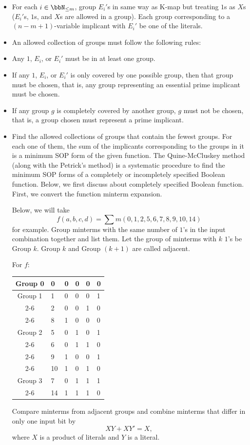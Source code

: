 \documentclass[a4paper,12pt]{article}
\begin{document}
\begin{itemize}
\begin{itemize}
\begin{itemize}
\begin{itemize}
\begin{itemize}
\begin{itemize}
\begin{itemize}
\begin{itemize}
\begin{itemize}
\item For each $i\in\bbN_{\leq m}$, group $E_i'$s in same way as K-map but treating $1$s as $X$s ($E_i'$s, $1$s, and $X$s are allowed in a group). Each group corresponding to a $(n-m+1)$-variable implicant with $E_i'$ be one of the literals.
\item An allowed collection of groups must follow the following rules:
\bit
\item Any $1$, $E_i$, or $E_i'$ must be in at least one group.
\item If any $1$, $E_i$, or $E_i'$ is only covered by one possible group, then that group must be chosen, that is, any group representing an essential prime implicant must be chosen.
\item If any group $g$ is completely covered by another group, $g$ must not be chosen, that is, a group chosen must represent a prime implicant.
\eit
\item Find the allowed collections of groups that contain the fewest groups. For each one of them, the sum of the implicants corresponding to the groups in it is a minimum SOP form of the given function.
\een
{}
The Quine-McCluskey method (along with the Petrick's method) is a systematic procedure to find the minimum SOP forms of a completely or incompletely specified Boolean function. Below, we first discuss about completely specified Boolean function.
First, we convert the function minterm expansion.

Below, we will take
\[f(a,b,c,d)=\sum m(0,1,2,5,6,7,8,9,10,14)\]
for example.
Group minterms with the same number of $1$'s in the input combination together and list them. Let the group of minterms with $k$ $1$'s be Group $k$. Group $k$ and Group $(k+1)$ are called adjacent.

For $f$:
\begin{longtable}[c]{|c|m|mmmm|}
\hline
Group 0 & 0 & 0 & 0 & 0 & 0 \\\hline
Group 1 & 1 & 0 & 0 & 0 & 1 \\\cline{2-6}
& 2 & 0 & 0 & 1 & 0 \\\cline{2-6}
& 8 & 1 & 0 & 0 & 0 \\\hline
Group 2 & 5 & 0 & 1 & 0 & 1 \\\cline{2-6}
& 6 & 0 & 1 & 1 & 0 \\\cline{2-6}
& 9 & 1 & 0 & 0 & 1 \\\cline{2-6}
& 10 & 1 & 0 & 1 & 0 \\\hline
Group 3 & 7 & 0 & 1 & 1 & 1 \\\cline{2-6}
& 14 & 1 & 1 & 1 & 0 \\\hline
\end{longtable}
Compare minterms from adjacent groups and combine minterms that differ in only one input bit by
\[XY+XY'=X,\]
where $X$ is a product of literals and $Y$ is a literal.


\end{itemize}
\end{itemize}
\end{itemize}
\end{itemize}
\end{itemize}
\end{itemize}
\end{itemize}
\end{itemize}
\end{itemize}
\end{document}
